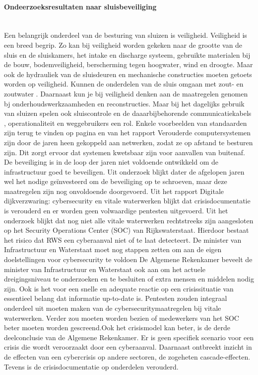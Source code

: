 \documentclass{article}
\begin{document}
	\paragraph{Ondeerzoeksresultaten naar sluisbeveiliging} \\
	Een belangrijk onderdeel van de besturing van sluizen is veiligheid. Veiligheid is een breed begrip.
	Zo kan bij veiligheid worden gekeken naar de grootte van de sluis en de sluiskamers, het intake en discharge systeem, gebruikte materialen bij de bouw, bodemveiligheid, berscherming tegen hoogwater, wind\cite[2-3]{CivilEngineeringDivision} en droogte. Maar ook de hydrauliek van de sluisdeuren en mechanische constructies moeten getoets worden op veiligheid. Kunnen de onderdelen van de sluis omgaan met zout- en zoutwater\cite[2-9]{CivilEngineeringDivision} . Daarnaast kun je bij veiligheid denken aan de maatregelen  genomen bj onderhoudswerkzaamheden en reconstructies. Maar bij het dagelijks gebruik van sluizen spelen ook sluiscontrole en de daaarbijbehorende communicatiekabels\cite[2-11]{CivilEngineeringDivision} , operationaliteit en weggebruikers\cite[2-13]{CivilEngineeringDivision}  een rol.
	Enkele voorbeelden van standaarden zijn terug te vinden op pagina\cite[2-43]{CivilEngineeringDivision} en \cite[2-54]{CivilEngineeringDivision}   van het rapport
	Verouderde computersystemen zijn door de jaren heen gekoppeld aan netwerken, zodat ze op afstand te besturen zijn. Dit zorgt ervoor dat systemen kwetsbaar zijn voor aanvallen van buitenaf. De beveiliging is in de loop der jaren niet voldoende ontwikkeld om de infrastructuur goed te beveiligen.
	Uit onderzoek\cite{hdsr30092022lichtprojectieswaterliniesluizen} blijkt dater de afgelopen jaren wel het nodige geïnvesteerd om de beveiliging op te schroeven, maar deze maatregelen zijn nog onvoldoende doorgevoerd.
	Uit het rapport Digitale dijkverzwaring: cybersecurity en vitale waterwerken blijkt dat crisisdocumentatie is verouderd en er worden geen volwaardige pentesten uitgevoerd. Uit het onderzoek blijkt dat nog niet alle vitale waterwerken rechtstreeks zijn aangesloten op het Security Operations Center (SOC) van Rijkswaterstaat. Hierdoor bestaat het risico dat RWS een cyberaanval niet of te laat detecteert. De minister van Infrastructuur en Waterstaat moet nog stappen zetten om aan de eigen doelstellingen voor cybersecurity te voldoen
	De Algemene Rekenkamer beveelt de minister van Infrastructuur en Waterstaat ook aan om het actuele dreigingsniveau te onderzoeken en te besluiten of extra mensen en middelen nodig zijn. Ook is het voor een snelle en adequate reactie op een crisissituatie van essentieel belang dat informatie up-to-date is. Pentesten zouden integraal onderdeel uit moeten maken van de cybersecuritymaatregelen bij vitale waterwerken. Verder zou moeten worden bezien of medewerkers van het SOC beter moeten worden gescreend\cite{thkwaterwerken}.Ook het crisismodel kan beter, is de derde deelconclusie van de Algemene Rekenkamer. Er is geen specifiek scenario voor een crisis die wordt veroorzaakt door een cyberaanval. Daarnaast ontbreekt inzicht in de effecten van een cybercrisis op andere sectoren, de zogeheten cascade-effecten. Tevens is de crisisdocumentatie op onderdelen verouderd\cite{rekenkamercybersecWater}.
\end{document}
